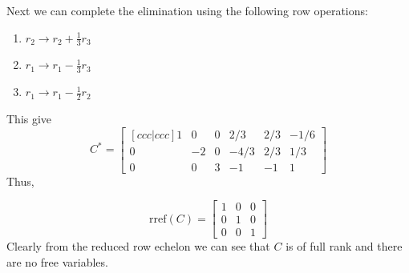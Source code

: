 Next we can complete the elimination using the following row operations:
\begin{enumerate}
    \item $r_{2} \rightarrow r_{2} + \frac{1}{3}r_{3}$
    \item $r_{1} \rightarrow r_{1} - \frac{1}{3}r_{3}$
    \item $r_{1} \rightarrow r_{1} - \frac{1}{2}r_{2}$
\end{enumerate}
This give
\begin{equation}
    C^{\ast} =
    \begin{bmatrix}[ccc|ccc]
        1   &   0   &   0   &   2/3     &  2/3  &   -1/6    \\
        0   &   -2  &   0   &   -4/3    &  2/3  &   1/3     \\
        0   &   0   &   3   &   -1      &  -1   &   1
    \end{bmatrix}
\end{equation}
Thus,
\begin{mdframed}[style=MyFrame]
    \begin{equation}
        \text{rref}(C) =
        \begin{bmatrix}
            1       &       0       &   0   \\
            0       &       1       &   0   \\
            0       &       0       &   1 
        \end{bmatrix}
    \end{equation}
    Clearly from the reduced row echelon we can see that $C$ is of full
    rank and there are no free variables.
\end{mdframed}
